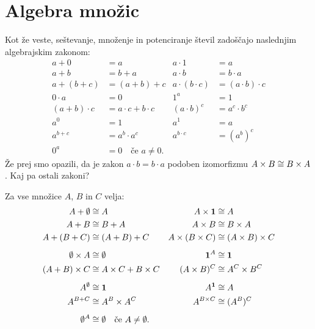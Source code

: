 
\section{Algebra množic}
\label{sec:algebra-mnozic}

Kot že veste, seštevanje, množenje in potenciranje števil zadoščajo naslednjim
algebrajskim zakonom:
%
\begin{align*}
  a + 0 &= a                   &     a \cdot 1 &= a \\
  a + b &= b + a               &     a \cdot b &= b \cdot a \\
  a + (b + c) &= (a + b) + c   &     a \cdot (b \cdot c) &= (a \cdot b) \cdot c \\[1ex]
  0 \cdot a &= 0                           &   1^a &= 1 \\
  (a + b) \cdot c &= a \cdot c + b \cdot c &   (a \cdot b)^c &= a^c \cdot b^c \\[1ex]
  a^0 &= 1                     &   a^1 &= a \\
  a^{b + c} &= a^b \cdot a^c   &   a^{b \cdot c} &= (a^b)^c \\[1ex]
  0^a &= 0 \quad \text{če $a \neq 0$.}
\end{align*}
%
Že prej smo opazili, da je zakon $a \cdot b = b \cdot a$ podoben izomorfizmu
$A \times B \cong B \times A$. Kaj pa ostali zakoni?

\begin{izrek}
  \label{izrek:algebra-mnozic}
  Za vse množice $A$, $B$ in $C$ velja:
  \begin{align*}
    A + \emptyset &\cong A                   &     A \times \mathtt{\mathbf{1}} &\cong A \\
    A + B &\cong B + A               &     A \times B &\cong B \times A \\
    A + (B + C) &\cong (A + B) + C   &     A \times (B \times C) &\cong (A \times B) \times C \\[1ex]
    \emptyset \times A &\cong \emptyset                           &   \mathtt{\mathbf{1}}^A &\cong \mathtt{\mathbf{1}} \\
    (A + B) \times C &\cong A \times C + B \times C &   (A \times B)^C &\cong A^C \times B^C \\[1ex]
    A^\emptyset &\cong \mathtt{\mathbf{1}}                     &   A^{\mathtt{\mathbf{1}}} &\cong A \\
    A^{B + C} &\cong A^B \times A^C   &   A^{B \times C} &\cong (A^B)^C \\[1ex]
    \emptyset^A &\cong \emptyset \quad \text{če $A \neq \emptyset$.}
  \end{align*}
\end{izrek}

